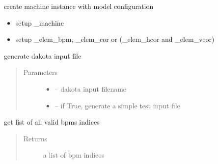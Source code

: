 \documentclass[letterpaper,10pt,english]{sphinxmanual}
\begin{document}
\begin{fulllineitems}
\begin{fulllineitems}
\label{\detokenize{src/apidocs/dakopt:genopt.dakopt.DakotaOC.bpms}}
\end{fulllineitems}


\begin{fulllineitems}
\label{\detokenize{src/apidocs/dakopt:genopt.dakopt.DakotaOC.create_machine}}
create machine instance with model configuration
\begin{itemize}
\item {} 
setup \_machine

\item {} 
setup \_elem\_bpm, \_elem\_cor or (\_elem\_hcor and \_elem\_vcor)

\end{itemize}

\end{fulllineitems}


\begin{fulllineitems}
\label{\detokenize{src/apidocs/dakopt:genopt.dakopt.DakotaOC.gen_dakota_input}}
generate dakota input file
\begin{quote}\begin{description}
\item[{Parameters}] \leavevmode\begin{itemize}
\item {} 
 -- dakota input filename

\item {} 
 -- if True, generate a simple test input file

\end{itemize}

\end{description}\end{quote}

\end{fulllineitems}


\begin{fulllineitems}
\label{\detokenize{src/apidocs/dakopt:genopt.dakopt.DakotaOC.get_all_bpms}}
get list of all valid bpms indices
\begin{quote}\begin{description}
\item[{Returns}] \leavevmode
a list of bpm indices


\end{description}
\end{quote}
\end{fulllineitems}
\end{fulllineitems}
\end{document}
